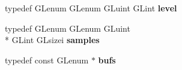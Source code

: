 \begin{DoxyCompactItemize}
\item 
\hypertarget{class_c_p_v_r_tgles2_ext_a49158fad242eb9651becfba298e2c243}{typedef G\+Lenum G\+Lenum G\+Luint G\+Lint {\bfseries level}}\label{class_c_p_v_r_tgles2_ext_a49158fad242eb9651becfba298e2c243}

\item 
\hypertarget{class_c_p_v_r_tgles2_ext_ab1c74d0d96ad8b7324938366e2355eda}{typedef G\+Lenum G\+Lenum G\+Luint \\*
G\+Lint G\+Lsizei {\bfseries samples}}\label{class_c_p_v_r_tgles2_ext_ab1c74d0d96ad8b7324938366e2355eda}

\item 
\hypertarget{class_c_p_v_r_tgles2_ext_ab53846368d499ce94b988d323da65555}{typedef const G\+Lenum $\ast$ {\bfseries bufs}}\label{class_c_p_v_r_tgles2_ext_ab53846368d499ce94b988d323da65555}

\end{DoxyCompactItemize}
